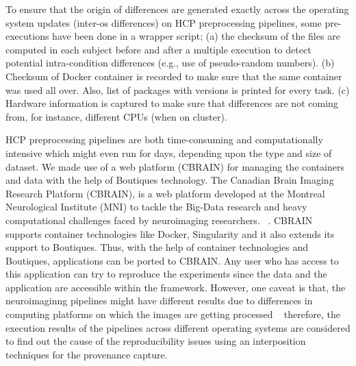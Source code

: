 \documentclass{article}
\begin{document}
To ensure that the origin of differences are generated exactly across the operating system updates (inter-os differences) 
on HCP preprocessing pipelines, some pre-executions have been done in a wrapper script; 
(a) the checksum of the files are computed in each subject before and after a multiple execution to detect 
potential intra-condition differences (e.g., use of pseudo-random numbers). 
(b) Checksum of Docker container is recorded to make sure that the same container was used all over. Also, list of packages 
with versions is printed for every task. (c) Hardware information is captured to make sure that differences are not coming from, for instance, different CPUs (when on cluster).

HCP preprocessing pipelines are both time-consuming and computationally intensive which might even run for days, depending upon 
the type and size of dataset. We made use of a web platform (CBRAIN) for managing the containers and data with the help of Boutiques technology. 
The Canadian Brain Imaging Research Platform (CBRAIN), is a web platform developed at the Montreal Neurological Institute (MNI) to tackle 
the Big-Data research and heavy computational challenges faced by neuroimaging researchers. ~\cite{DBLP:journals/fini/DasGRSPMSRSKMKR17}.
CBRAIN supports container technologies like Docker, Singularity and it also extends its support to Boutiques. Thus, 
with the help of container technologies and Boutiques, applications can be ported to CBRAIN. Any user who has access to this application 
can try to reproduce the experiments since the data and the application are accessible within the framework. However, one caveat is that, 
the neuroimaginng pipelines might have different results due to differences in computing platforms on which the images are getting processed ~\cite{10.3389/conf.fninf.2014.18.00076}
therefore, the execution results of the pipelines across different operating systems are considered to find out 
the cause of the reproducibility issues using an interposition techniques for the provenance capture.
\end{document}
